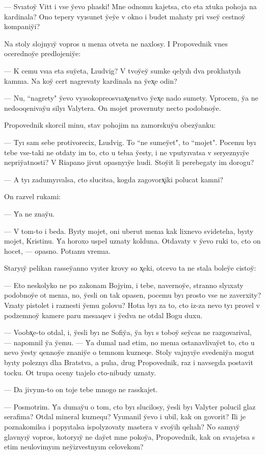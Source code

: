 \documentclass[10pt]{book}
\begin{document}
— Svıatoy̆ Vitt i vse y̆evo plıaski! Mne odnomu kajetsa, cto eta xtuka pohoja na kardinala? Ono tepery vyısunet y̆ey̆e v okno i budet mahaty pri vsey̆ cestnoy̆ kompaniy̆i?

Na stoly slojnyıy̆ vopros u menıa otveta ne naxlosy. I Propovednik vnes ocerednoy̆e predlojeniy̆e:

— K cemu vsıa eta suy̆eta, Lıudvig? V tvoy̆ey̆ sumke qelyıh dva proklıatyıh kamnıa. Na koy̆ cert nagrevaty kardinala na y̆ex̨e odin?

— Nu, ``nagrety" y̆evo vyısokopreosvıax̨enstvo y̆ex̨e nado sumety. Vprocem, y̆a ne nedooqenivay̆u silyı Valytera. On mojet provernuty necto podobnoy̆e.

Propovednik skorcil minu, stav pohojim na zamorskuy̆u obezy̆anku:

— Tyı sam sebe protivorecix, Lıudvig. To ``ne sumey̆et", to ``mojet". Pocemu byı tebe vse-taki ne otdaty im to, cto u tebıa y̆esty, i ne vputyıvatsa v seryeznyıy̆e nepriy̆atnosti? V Riapano jivut opasnyıy̆e lıudi. Stoy̆it li perebegaty im dorogu?

— A tyı zadumyıvalsa, cto slucitsa, kogda zagovorx̨iki polucat kamni?

On razvel rukami:

— Y̆a ne znay̆u.

— V tom-to i beda. Byıty mojet, oni uberut menıa kak lixnevo svidetelıa, byıty mojet, Kristinu. Y̆a horoxo uspel uznaty kolduna. Otdavaty v y̆evo ruki to, cto on hocet, — opasno. Potıanu vremıa.

Staryıy̆ pelikan rassey̆anno vyıter krovy so x̨eki, otcevo ta ne stala boley̆e cistoy̆:

— Eto neskolyko ne po zakonam Bojyim, i tebe, navernoy̆e, stranno slyıxaty podobnoy̆e ot menıa, no, y̆esli on tak opasen, pocemu byı prosto vse ne zaverxity? Vzıaty pistolet i raznesti y̆emu golovu? Hotıa byı za to, cto iz-za nevo tyı provel v podzemnoy̆ kamere paru mesıaqev i y̆edva ne otdal Bogu duxu.

— Voobx̨e-to otdal, i, y̆esli byı ne Sofiy̆a, y̆a byı s toboy̆ sey̆cas ne razgovarival, — napomnil y̆a y̆emu. — Y̆a dumal nad etim, no menıa ostanavlivay̆et to, cto u nevo y̆esty qennoy̆e znaniy̆e o temnom kuzneqe. Stoly vajnyıy̆e svedeniy̆a mogut byıty poleznyı dlıa Bratstva, a pulıa, drug Propovednik, raz i navsegda postavit tocku. Ot trupa oceny tıajelo cto-nibudy uznaty.

— Da jivyım-to on toje tebe mnogo ne rasskajet.

— Posmotrim. Y̆a dumay̆u o tom, cto byı slucilosy, y̆esli byı Valyter polucil glaz serafima? Otdal mineral kuznequ? Vyımanil y̆evo i ubil, kak on govorit? Ili je poznakomilsa i popyıtalsa ispolyzovaty mastera v svoy̆ih qelıah? No samyıy̆ glavnyıy̆ vopros, kotoryıy̆ ne day̆et mne pokoy̆a, Propovednik, kak on svıajetsa s etim neulovimyım ney̆izvestnyım celovekom?
\end{document}
